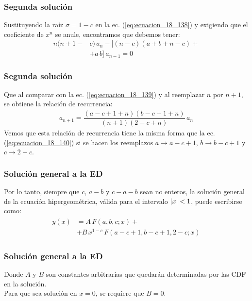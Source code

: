 \documentclass[12pt]{beamer}
\begin{document}
\begin{frame}
\frametitle{Segunda solución}
Sustituyendo la raíz $\sigma = 1 - c$ en la ec.  (\ref{eq:ecuacion_18_138}) y exigiendo que el coeficiente de $x^{n}$ se anule, encontramos que debemos tener:
\pause 
\begin{align*}
n (n + 1 - &c) \, a_{n} - \big[ (n - c)(a + b + n - c) + \\[1em]
&+ a \, b \big] \, a_{n-1} = 0
\end{align*}
\end{frame}
\begin{frame}
\frametitle{Segunda solución}
Que al comparar con la ec. (\ref{eq:ecuacion_18_139}) y al reemplazar $n$ por $n + 1$, se obtiene la relación de recurrencia:
\pause
\begin{align*}
a_{n+1} = \dfrac{(a - c + 1 + n)(b -c + 1 + n)}{(n + 1)(2 - c + n)} \, a_{n}
\end{align*}
Vemos que esta relación de recurrencia tiene la misma forma que la ec. (\ref{eq:ecuacion_18_140}) si se hacen los reemplazos $a \to a - c + 1$, $b \to b - c + 1$ y $c \to 2 - c$.
\end{frame}
\begin{frame}
\frametitle{Solución general a la ED}
Por lo tanto, siempre que $c$, $a - b$ y $c - a - b$ sean no enteros, la solución general de la ecuación hipergeométrica, válida para el intervalo $\abs{x} < 1$, puede escribirse como:
\pause
\begin{align}
\begin{aligned}
y (x) &= A \, F (a, b, c; x) + \\[1em]
&+ B \, x^{1-c} \, F (a-c+1, b - c + 1, 2 - c; x)
\end{aligned}
\label{eq:ecuacion_18_143}
\end{align}
\end{frame}
\begin{frame}
\frametitle{Solución general a la ED}
Donde $A$ y $B$ son constantes arbitrarias que quedarán determinadas por las CDF en la solución.
\\
\bigskip
\pause
Para que sea solución en $x = 0$, se requiere que $B = 0$.
\end{frame}
\end{document}
